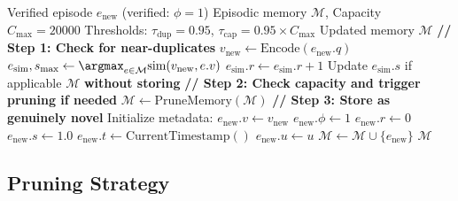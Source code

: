 \documentclass[12pt,a4paper]{article}
\theoremstyle{definition}
\begin{document}
\begin{algorithm}[htbp]
\caption{Strategic Storage with Novelty Checking}
\begin{algorithmic}[1]
\Require Verified episode $e_{\text{new}}$ (verified: $\phi = 1$)
\Require Episodic memory $\mathcal{M}$, Capacity $C_{\max} = 20000$
\Require Thresholds: $\tau_{\text{dup}} = 0.95$, $\tau_{\text{cap}} = 0.95 \times C_{\max}$
\Ensure Updated memory $\mathcal{M}$
\State
\State \textbf{// Step 1: Check for near-duplicates}
\State $v_{\text{new}} \gets \text{Encode}(e_{\text{new}}.q)$
\State $e_{\text{sim}}, s_{\text{max}} \gets \argmax_{e \in \mathcal{M}} \text{sim}(v_{\text{new}}, e.v)$
\State
{} 
    \State $e_{\text{sim}}.r \gets e_{\text{sim}}.r + 1$ 
    \State Update $e_{\text{sim}}.s$ if applicable 
    \State \Return $\mathcal{M}$ \textbf{without storing} 
\EndIf
\State
\State \textbf{// Step 2: Check capacity and trigger pruning if needed}
 
    \State $\mathcal{M} \gets \text{PruneMemory}(\mathcal{M})$ 
\EndIf
\State
\State \textbf{// Step 3: Store as genuinely novel}
\State Initialize metadata:
\State \quad $e_{\text{new}}.v \gets v_{\text{new}}$ 
\State \quad $e_{\text{new}}.\phi \gets 1$ 
\State \quad $e_{\text{new}}.r \gets 0$ 
\State \quad $e_{\text{new}}.s \gets 1.0$ 
\State \quad $e_{\text{new}}.t \gets \text{CurrentTimestamp}()$
\State \quad $e_{\text{new}}.u \gets u$ 
\State
\State $\mathcal{M} \gets \mathcal{M} \cup \{e_{\text{new}}\}$ 
\State \Return $\mathcal{M}$
\end{algorithmic}
\end{algorithm}

\subsection{Pruning Strategy}
\end{document}
